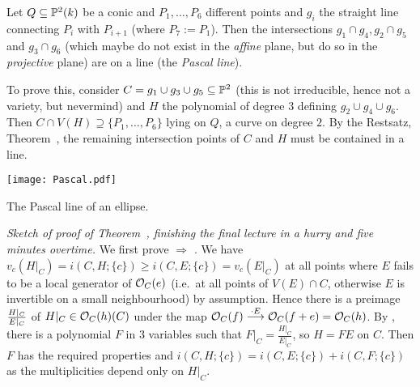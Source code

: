 \documentclass[a4paper,parskip=half,numbers=enddot, DIV=12, headheight=30pt]{scrreprt}
\begin{document}
\begin{example*}
Let $Q\subseteq \mathbb{P}^2(k)$ be a conic and $P_1,\dotsc,P_6$ different points and $g_i$ the straight line connecting
$P_i$ with $P_{i+1}$ (where $P_7 := P_1$).
Then the intersections $g_1\cap g_4, g_2\cap g_5$ and $g_3\cap g_6$ (which maybe do not exist in the \emph{affine} plane,
but do so in the \emph{projective} plane)  are on a line (the \emph{Pascal line}).

To prove this, consider $C=g_1\cup g_3\cup g_5\subseteq \mathbb{P}^2$ (this is not irreducible, hence not a variety, but nevermind)
and $H$ the polynomial of degree $3$ defining $g_2\cup g_4\cup g_6$.
Then $C\cap V(H) \supseteq \{P_1,\dotsc,P_6\}$ lying on $Q$, a curve on degree $2$.
By the Restsatz, Theorem~, the remaining intersection points of $C$ and $H$ must be contained in a line.
\begin{center}
	\texttt{[image: Pascal.pdf]}
	
	The Pascal line of an ellipse.
\end{center}
\end{example*}
\emph{Sketch of proof of Theorem~, finishing the final lecture in a hurry and five minutes overtime.}
We first prove  $\Rightarrow$ .
We have $v_c(H|_C)=i(C,H;\{c\}) \geq i(C,E;\{c\})=v_c(E|_C)$ at all points where $E$ fails to be a local generator of
$\mathcal{O}_C(e)$ (i.e.\ at all points of $V(E)\cap C$, otherwise $E$ is invertible on a small neighbourhood) by assumption. Hence there is a preimage $\frac{H|_C}{\smash{E|_C}}$
of $H\vert_C \in \mathcal{O}_C(h)(C)$ under the map $\Oo_C(f)\morphism[\cdot E] \Oo_C(f+e) = \Oo_C(h)$.
By , there is a polynomial $F$ in $3$ variables such that
$F\vert_C = \frac{H\vert_C}{E\vert_C}$, so $H=FE$ on $C$. Then $F$ has the required properties
and $i(C,H;\{c\}) = i(C,E;\{c\}) + i(C,F;\{c\})$ as the multiplicities
depend only on $H\vert_C$.
\end{document}
